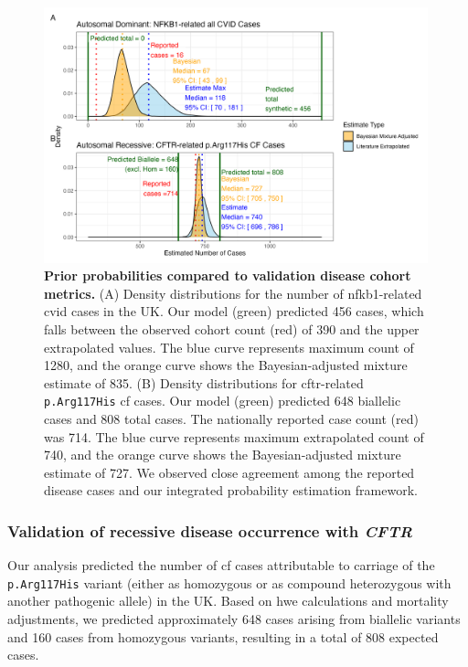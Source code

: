 \begin{figure}[h]
  \centering
  \includegraphics[width=0.99\textwidth]{../images/validation_studies_bayesian_adjusted_estimates.png}
  \caption{\textbf{Prior probabilities compared to validation disease cohort metrics.}
  (A) Density distributions for the number of \ac{nfkb1}-related \ac{cvid} cases in the UK. 
  Our model (green) predicted 456 cases, which falls between the observed cohort count (red) of 390 and the upper extrapolated values.
  The blue curve represents maximum count of 1280, and the orange curve shows the Bayesian-adjusted mixture estimate of 835. 
(B) Density distributions for \ac{cftr}-related \texttt{p.Arg117His} \ac{cf} cases. 
Our model (green) predicted 648 biallelic cases and 808 total cases.
The nationally reported case count (red) was 714.
The blue curve represents maximum extrapolated count of 740, and the orange curve shows the Bayesian-adjusted mixture estimate of 727. We observed close agreement among the reported disease cases and our integrated probability estimation framework.}
  \label{fig:validation_studies_bayesian_adjusted_estimates}
\end{figure}

\FloatBarrier
\subsubsection{Validation of recessive disease occurrence with \textit{CFTR}}

Our analysis predicted the number of \ac{cf} cases attributable to carriage of the \texttt{p.Arg117His} variant (either as homozygous or as compound heterozygous with another pathogenic allele) in the UK. Based on \ac{hwe} calculations and mortality adjustments, we predicted approximately 648 cases arising from biallelic variants and 160 cases from homozygous variants, resulting in a total of 808 expected cases.

